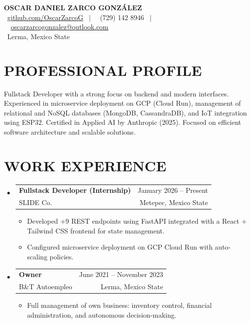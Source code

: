 \documentclass[letterpaper,11pt]{article}
\makeatletter
\newcommand{\resumeSubheading}[4]{
    \vspace{-1pt}\item
      \begin{tabular*}{0.97\textwidth}[t]{l@{\extracolsep{\fill}}r}
        \textbf{#1} & \small #2 \\
        \small#3 & \small #4 \\
      \end{tabular*}\vspace{-6pt}
  }
\newcommand{\resumeItemListStart}{\begin{itemize}[leftmargin=0.15in, label={$\circ$}]}
\newcommand{\resumeItemListEnd}{\end{itemize}\vspace{-3pt}}
\makeatother
\begin{document}
  \begin{center}
      \textbf{\Huge OSCAR DANIEL ZARCO GONZÁLEZ} \\ \vspace{1pt}
      \small 
      \faGithub \ \href{https://github.com/OscarZarcoG/}{github.com/OscarZarcoG} \ $|$ \ 
      \faPhone \ (729) 142 8946 \ $|$ \ 
      \faEnvelope \ \href{mailto:oscarzarcogonzalez@outlook.com}{oscarzarcogonzalez@outlook.com} \\
      \faMapMarker \ Lerma, Mexico State
  \end{center}

  \vspace{-5pt}

  \section{PROFESSIONAL PROFILE}
  \small Fullstack Developer with a strong focus on backend and modern interfaces. Experienced in microservice deployment on GCP (Cloud Run), management of relational and NoSQL databases (MongoDB, CassandraDB), and IoT integration using ESP32. Certified in Applied AI by Anthropic (2025). Focused on efficient software architecture and scalable solutions.

  \section{WORK EXPERIENCE}
    \begin{itemize}[leftmargin=0.15in, label={}]
      \resumeSubheading
        {Fullstack Developer (Internship)}{January 2026 -- Present}
        {SLIDE Co.}{Metepec, Mexico State}
        \resumeItemListStart
          \item Developed +9 REST endpoints using FastAPI integrated with a React + Tailwind CSS frontend for state management.
          \item Configured microservice deployment on GCP Cloud Run with auto-scaling policies.
        \resumeItemListEnd

      \resumeSubheading
        {Owner}{June 2021 -- November 2023}
        {B\&T Autoempleo}{Lerma, Mexico State}
        \resumeItemListStart
          \item Full management of own business: inventory control, financial administration, and autonomous decision-making.
        \resumeItemListEnd
    \end{itemize}

  \vspace{-5pt}
\end{document}
